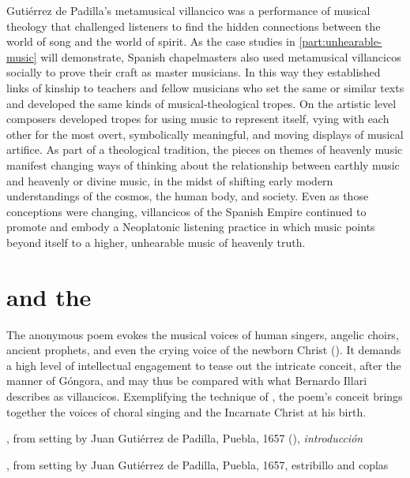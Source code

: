 Gutiérrez de Padilla's metamusical villancico was a performance of musical
theology that challenged listeners to find the hidden connections between the
world of song and the world of spirit.
As the case studies in \cref{part:unhearable-music} will demonstrate, Spanish
chapelmasters also used metamusical villancicos socially to prove their craft
as master musicians.
In this way they established links of kinship to teachers and fellow musicians
who set the same or similar texts and developed the same kinds of
musical-theological tropes.
On the artistic level composers developed tropes for using music to represent
itself, vying with each other for the most overt, symbolically meaningful, and
moving displays of musical artifice.
As part of a theological tradition, the pieces on themes of heavenly music
manifest changing ways of thinking about the relationship between earthly music
and heavenly or divine music, in the midst of shifting early modern
understandings of the cosmos, the human body, and society.
Even as those conceptions were changing, villancicos of the Spanish Empire
continued to promote and embody a Neoplatonic listening practice in which music
points beyond itself to a higher, unhearable music of heavenly truth.

\section{ and the }

The anonymous poem evokes the musical voices of human singers, angelic choirs,
ancient prophets, and even the crying voice of the newborn Christ
().%
    \Autocites
    [37--38, 119--132]{Cashner:WLSCM32}
    [133--203]{Cashner:PhD}
It demands a high level of intellectual engagement to tease out the intricate
conceit, after the manner of Góngora, and may thus be compared with what
Bernardo Illari describes as  villancicos.%
    \Autocite[, 304--308]{Illari:Polychoral}
Exemplifying the technique of , the poem's conceit brings
together the voices of choral singing and the Incarnate Christ at his birth.

{, from setting by Juan Gutiérrez
de Padilla, Puebla, 1657 (), \emph{introducción}}

{, from setting by Juan Gutiérrez de Padilla,
Puebla, 1657, estribillo and coplas}


